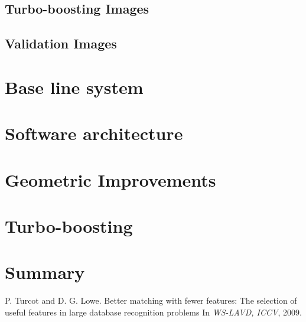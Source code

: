 \documentclass[11pt, onecolumn, a4paper, final]{report} %
\begin{document}
\section{Turbo-boosting Images}
\label{sec:turboimages}

\section{Validation Images}
\label{sec:validationimages}


\chapter{Base line system}
\label{chpt:system}

\chapter{Software architecture}
\label{chpt:architecture}


\chapter{Geometric Improvements}
\label{chpt:geoimprovements}


\chapter{Turbo-boosting}
\label{chpt:turboboosting}


\chapter{Summary}


\begin{thebibliography}{99}

		P. Turcot and D. G. Lowe.
		Better matching with fewer features: The selection of useful features in large database recognition problems
		In \emph{WS-LAVD, ICCV}, 2009.
	  
\end{thebibliography}
\end{document}
